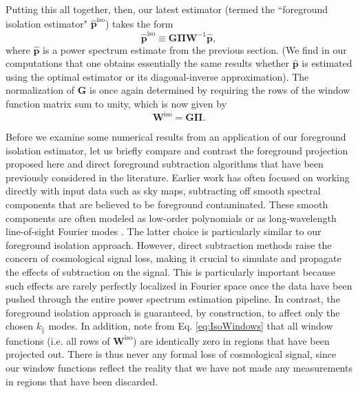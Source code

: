 \documentclass[twocolumn,aps,prd,nofootinbib,showpacs]{revtex4-1}
\begin{document}
Putting this all together, then, our latest estimator (termed the ``foreground isolation estimator" $\mathbf{\widehat{p}}^\textrm{iso}$) takes the form
\begin{equation}
\mathbf{\widehat{p}}^\textrm{iso} \equiv \mathbf{G} \boldsymbol \Pi \mathbf{W}^{-1} \mathbf{\widehat{p}},
\end{equation}
where $\mathbf{\widehat{p}}$ is a power spectrum estimate from the previous section.  (We find in our computations that one obtains essentially the same results whether $\mathbf{\widehat{p}}$ is estimated using the optimal estimator or its diagonal-inverse approximation).  The normalization of $\mathbf{G}$ is once again determined by requiring the rows of the window function matrix sum to unity, which is now given by
\begin{equation}
\label{eq:IsoWindows}
\mathbf{W}^\textrm{iso} = \mathbf{G} \boldsymbol \Pi.
\end{equation}

Before we examine some numerical results from an application of our foreground isolation estimator, let us briefly compare and contrast the foreground projection proposed here and direct foreground subtraction algorithms that have been previously considered in the literature.  Earlier work has often focused on working directly with input data such as sky maps, subtracting off smooth spectral components that are believed to be foreground contaminated.  These smooth components are often modeled as low-order polynomials \cite{Wang2006,Liu2009a,Bowman2009,Liu2009b} or as long-wavelength line-of-sight Fourier modes \cite{Petrovic2011}.  The latter choice is particularly similar to our foreground isolation approach.  However, direct subtraction methods raise the concern of cosmological signal loss, making it crucial to simulate and propagate the effects of subtraction on the signal.  This is particularly important because such effects are rarely perfectly localized in Fourier space once the data have been pushed through the entire power spectrum estimation pipeline.  In contrast, the foreground isolation approach is guaranteed, by construction, to affect only the chosen $k_\parallel$ modes.  In addition, note from Eq. \eqref{eq:IsoWindows} that all window functions (i.e. all rows of $\mathbf{W}^\textrm{iso}$) are identically zero in regions that have been projected out.  There is thus never any formal loss of cosmological signal, since our window functions reflect the reality that we have not made any measurements in regions that have been discarded.
\end{document}
